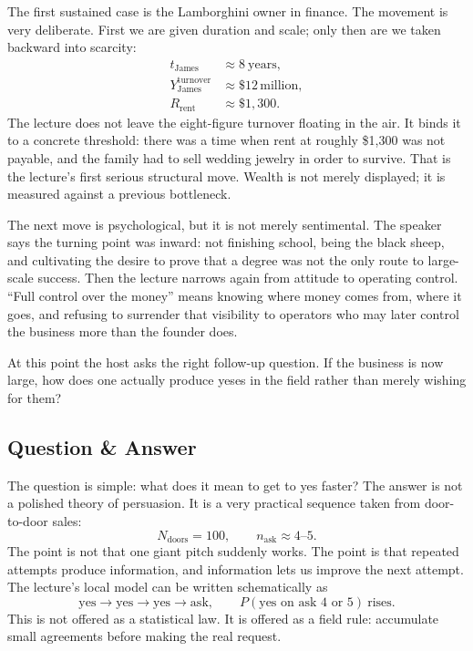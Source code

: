 The first sustained case is the Lamborghini owner in finance. The movement is very deliberate. First we are given duration and scale; only then are we taken backward into scarcity:
\begin{align}
t_{\text{James}} &\approx 8\ \text{years}, \\
Y_{\text{James}}^{\text{turnover}} &\approx \$12\,\text{million}, \\
R_{\text{rent}} &\approx \$1{,}300.
\end{align}
The lecture does not leave the eight-figure turnover floating in the air. It binds it to a concrete threshold: there was a time when rent at roughly \$1{,}300 was not payable, and the family had to sell wedding jewelry in order to survive. That is the lecture's first serious structural move. Wealth is not merely displayed; it is measured against a previous bottleneck.

The next move is psychological, but it is not merely sentimental. The speaker says the turning point was inward: not finishing school, being the black sheep, and cultivating the desire to prove that a degree was not the only route to large-scale success. Then the lecture narrows again from attitude to operating control. ``Full control over the money'' means knowing where money comes from, where it goes, and refusing to surrender that visibility to operators who may later control the business more than the founder does.

At this point the host asks the right follow-up question. If the business is now large, how does one actually produce yeses in the field rather than merely wishing for them?

\subsection{Question \& Answer}

The question is simple: what does it mean to get to yes faster? The answer is not a polished theory of persuasion. It is a very practical sequence taken from door-to-door sales:
\begin{equation}
N_{\text{doors}} = 100,
\qquad
n_{\text{ask}} \approx 4\text{--}5.
\end{equation}
The point is not that one giant pitch suddenly works. The point is that repeated attempts produce information, and information lets us improve the next attempt. The lecture's local model can be written schematically as
\begin{equation}
\text{yes} \to \text{yes} \to \text{yes} \to \text{ask},
\qquad
P(\text{yes on ask }4\text{ or }5)\ \text{rises}.
\end{equation}
This is not offered as a statistical law. It is offered as a field rule: accumulate small agreements before making the real request.

